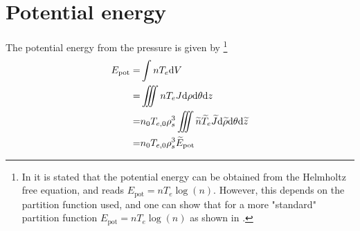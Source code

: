 \section{Potential energy}
%
The potential energy from the pressure is given by%
\footnote{In \cite{Wiesenberger2014} it is stated that the potential energy can be obtained from the Helmholtz free equation, and reads $E_{\text{pot}}=nT_e\log(n)$.
    However, this depends on the partition function used, and one can show that for a more "standard" partition function $E_{\text{pot}}=nT_e\log(n)$ as shown in \cite{kittel1980book}.}%
%
\begin{align*}
    E_{\text{pot}}
    =& \int nT_e \text{d} V
    \\
    =& \iiint nT_e J \text{d}\rho \text{d}\theta \text{d} z
    \\
    =& n_0T_{e,0}\rho_s^3\iiint \widetilde{ n}\widetilde{ T}_e \widetilde{ J} \text{d}\widetilde{ \rho} \text{d}\theta \text{d} \widetilde{ z}
    \\
    =& n_0T_{e,0}\rho_s^3\widetilde{ E}_{\text{pot}}
\end{align*}
